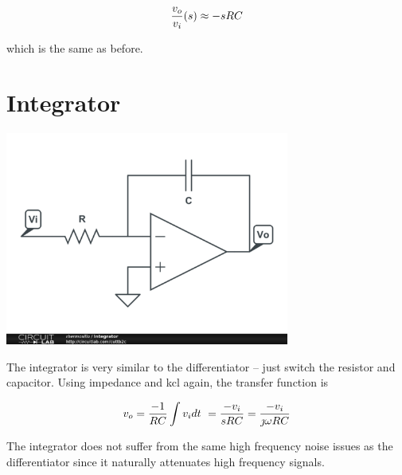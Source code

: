 \textcolor{red}{
\begin{equation}
\frac{v_o}{v_i}(s) \approx -sRC
\label{eq:differentiator_series_cap}
\end{equation}
}

which is the same as before. \autocite[79-80]{op-amp-circuits-johnson}

\section{Integrator}
\begin{center}
	\includegraphics[width=0.70\textwidth]{schematics/integrator.PNG}
\end{center}
The integrator is very similar to the differentiator -- just switch the resistor and capacitor. Using impedance and \ac{kcl} again, the transfer function is

\textcolor{red}{
\begin{equation}
v_o = \frac{-1}{RC}\int v_i dt\ = \frac{-v_i}{sRC} = \frac{-v_i}{\jmath \omega RC}
\label{eq:integrator}
\end{equation}
}

The integrator does not suffer from the same high frequency noise issues as the differentiator since it naturally attenuates high frequency signals.

